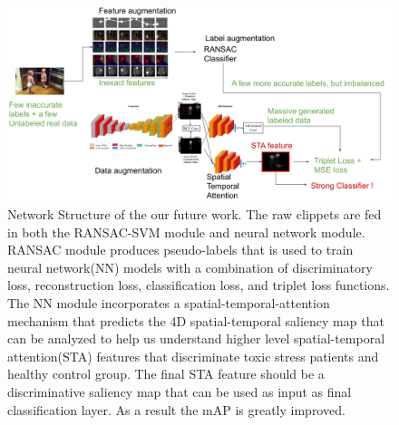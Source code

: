 \documentclass[a4paper, times, 12pt, ,onecolumn,oneside,top=1.0cm,bottom=1.0cm,left=1.0 cm,right=1cm]{article}
\begin{document}
\begin{figure}[ht]
  \centering
  \includegraphics[scale = 0.2]{imgs/future_work.png}
  \caption{ Network Structure of the our future work. The raw clippets are fed in both the RANSAC-SVM module and neural network module. RANSAC module produces pseudo-labels that is used to train neural network(NN) models with a combination of discriminatory loss, reconstruction loss, classification loss, and triplet loss functions. The NN module incorporates a spatial-temporal-attention mechanism that predicts the 4D spatial-temporal saliency map that can be analyzed to help us understand higher level spatial-temporal attention(STA) features that discriminate toxic stress patients and healthy control group. The final STA feature should be a discriminative saliency map that can be used as input as final classification layer. As a result the mAP is greatly improved.}
    \label{fig:baseline}
\end{figure}
\clearpage


\end{document}
